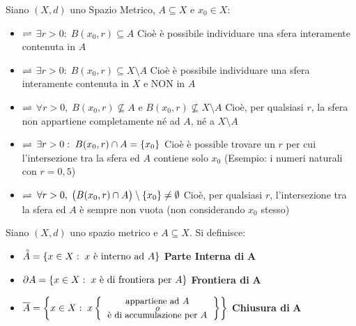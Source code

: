 \begin{definition}
	\label{def:pti_e_spa_metr}
	Siano $(X,d)$ uno Spazio Metrico, $A \subseteq X$ e $x_0 \in X$:
	\begin{itemize}
		\item {} $\rightleftharpoons$ \quad $\exists r > 0:\; B(x_0, r) \subseteq A$\newline
			{\footnotesize Cioè è possibile individuare una sfera interamente contenuta in $A$}
		\item {} $\rightleftharpoons$ \quad $\exists r > 0:\; B(x_0, r) \subseteq X \setminus A$\newline
			{\footnotesize Cioè è possibile individuare una sfera interamente contenuta in $X$ e NON in $A$}
		\item {} $\rightleftharpoons$ \quad $\forall r > 0,\; B(x_0, r) \nsubseteq A \text{ e } B(x_0, r) \nsubseteq X \setminus A$\newline
			{\footnotesize Cioè, per qualsiasi $r$, la sfera non appartiene completamente né ad $A$, né a $X \setminus A$}
		\item {} $\rightleftharpoons$ \quad $\exists r > 0:\; B(x_0, r) \cap A = \left\{x_0\right\}$\newline
			{\footnotesize Cioè è possible trovare un $r$ per cui l'intersezione tra la sfera ed $A$ contiene solo $x_0$ (Esempio: i numeri naturali con $r = 0,5$)}
		\item {} $\rightleftharpoons$ \quad $\forall r > 0,\; \bigl( B(x_0, r) \cap A \bigr) \setminus \left\{x_0\right\} \neq \emptyset$\newline
			{\footnotesize Cioè, per qualsiasi $r$, l'intersezione tra la sfera ed $A$ è sempre non vuota (non considerando $x_0$ stesso)}
	\end{itemize}
\end{definition}
\begin{definition}
	\label{def:topologia_spa_metri}
	Siano $(X,d)$ uno spazio metrico e $A \subseteq X$. Si definisce:
	\begin{itemize}
		\item $\accentset{\circ}{A} = \left\{x \in X:\; x \text{ è interno ad } A\right\}$ \hfill \textbf{Parte Interna di} $\boldsymbol{A}$
		\item $\partial A = \left\{x \in X:\; x \text{ è di frontiera per } A\right\}$ \hfill \textbf{Frontiera di} $\boldsymbol{A}$
		\item $\overline{A} = \brackets{x \in X:\; x \brackets{\text{\small\begin{tabular}{c}appartiene ad $A$\\[-1ex] \textit{o}\\[-1ex] è di accumulazione per $A$\end{tabular}}}}$ \hfill \textbf{Chiusura di} $\boldsymbol{A}$
	\end{itemize}
\end{definition}
